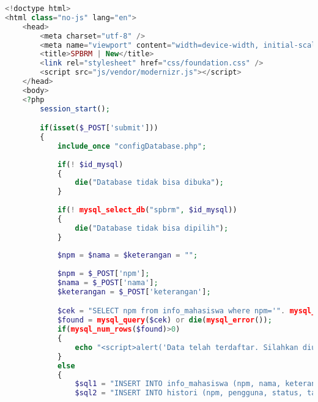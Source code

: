 \begin{lstlisting}[language=php,basicstyle=\tiny,caption=new.php]
<!doctype html>
<html class="no-js" lang="en">
	<head>
		<meta charset="utf-8" />
		<meta name="viewport" content="width=device-width, initial-scale=1.0" />
		<title>SPBRM | New</title>
		<link rel="stylesheet" href="css/foundation.css" />
		<script src="js/vendor/modernizr.js"></script>
	</head>
	<body>
	<?php
		session_start();

		if(isset($_POST['submit']))
		{
			include_once "configDatabase.php";
				
			if(! $id_mysql)
			{
				die("Database tidak bisa dibuka");
			}
				
			if(! mysql_select_db("spbrm", $id_mysql))
			{
				die("Database tidak bisa dipilih");
			}
			
			$npm = $nama = $keterangan = "";
			
			$npm = $_POST['npm'];
			$nama = $_POST['nama'];
			$keterangan = $_POST['keterangan']; 

			$cek = "SELECT npm from info_mahasiswa where npm='". mysql_real_escape_string($npm)  ."'";
			$found = mysql_query($cek) or die(mysql_error());
			if(mysql_num_rows($found)>0)
			{
				echo "<script>alert('Data telah terdaftar. Silahkan diulangi dengan data yang lain.');window.location.href='new.php';</script>";
			}
			else
			{
				$sql1 = "INSERT INTO info_mahasiswa (npm, nama, keterangan) VALUES ('". mysql_real_escape_string($npm)  ."', '". mysql_real_escape_string($nama)  ."', '". mysql_real_escape_string($keterangan)  ."')";
				$sql2 = "INSERT INTO histori (npm, pengguna, status, tanggal_pembaruan, keterangan) VALUES ('". mysql_real_escape_string($npm)  ."', '".$_SESSION['email']."', 'membuat entri', now(), '". mysql_real_escape_string($keterangan)  ."')";
				

\end{lstlisting}
